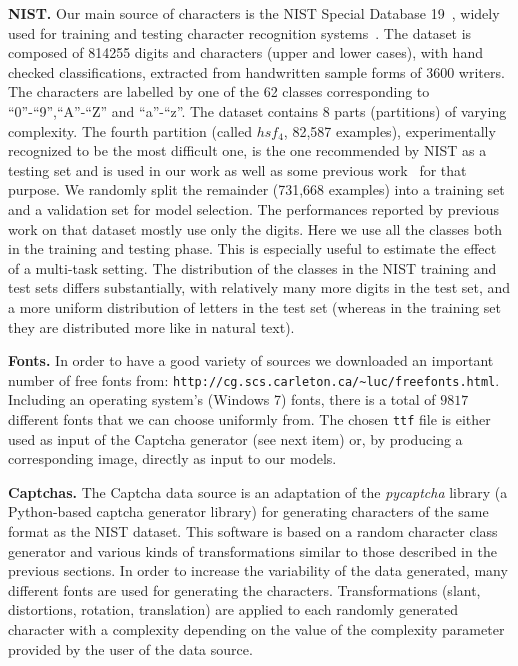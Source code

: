 \documentclass{article} %
\begin{document}
{\bf NIST.}
Our main source of characters is the NIST Special Database 19~\citep{Grother-1995}, 
widely used for training and testing character
recognition systems~\citep{Granger+al-2007,Cortes+al-2000,Oliveira+al-2002-short,Milgram+al-2005}. 
The dataset is composed of 814255 digits and characters (upper and lower cases), with hand checked classifications,
extracted from handwritten sample forms of 3600 writers. The characters are labelled by one of the 62 classes 
corresponding to ``0''-``9'',``A''-``Z'' and ``a''-``z''. The dataset contains 8 parts (partitions) of varying complexity. 
The fourth partition (called $hsf_4$, 82,587 examples), 
experimentally recognized to be the most difficult one, is the one recommended 
by NIST as a testing set and is used in our work as well as some previous work~\citep{Granger+al-2007,Cortes+al-2000,Oliveira+al-2002-short,Milgram+al-2005}
for that purpose. We randomly split the remainder (731,668 examples) into a training set and a validation set for
model selection. 
The performances reported by previous work on that dataset mostly use only the digits.
Here we use all the classes both in the training and testing phase. This is especially
useful to estimate the effect of a multi-task setting.
The distribution of the classes in the NIST training and test sets differs
substantially, with relatively many more digits in the test set, and a more uniform distribution
of letters in the test set (whereas in the training set they are distributed
more like in natural text).

{\bf Fonts.} 
In order to have a good variety of sources we downloaded an important number of free fonts from:
{\tt http://cg.scs.carleton.ca/\textasciitilde luc/freefonts.html}.
Including an operating system's (Windows 7) fonts, there is a total of $9817$ different fonts that we can choose uniformly from.
The chosen {\tt ttf} file is either used as input of the Captcha generator (see next item) or, by producing a corresponding image, 
directly as input to our models.

{\bf Captchas.}
The Captcha data source is an adaptation of the \emph{pycaptcha} library (a Python-based captcha generator library) for 
generating characters of the same format as the NIST dataset. This software is based on
a random character class generator and various kinds of transformations similar to those described in the previous sections. 
In order to increase the variability of the data generated, many different fonts are used for generating the characters. 
Transformations (slant, distortions, rotation, translation) are applied to each randomly generated character with a complexity
depending on the value of the complexity parameter provided by the user of the data source. 
\end{document}
